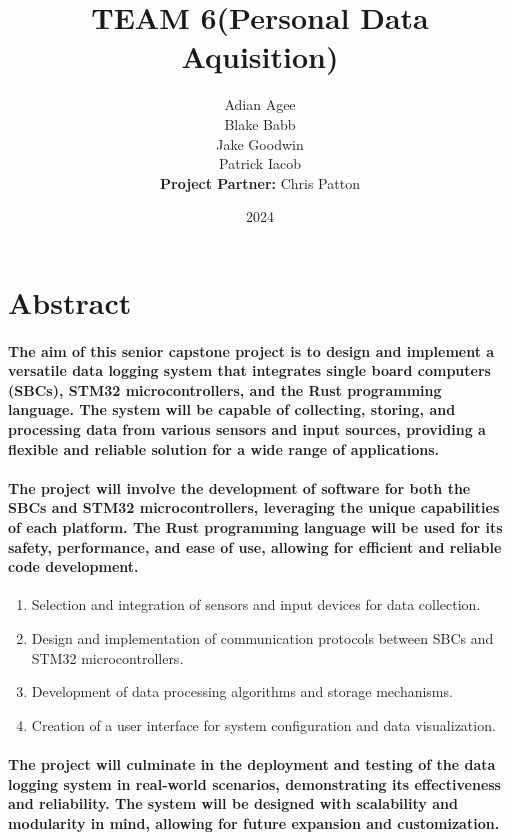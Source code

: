 \documentclass{article}
\title{TEAM 6(Personal Data Aquisition)}
\author{
Adian Agee\\
Blake Babb\\
Jake Goodwin\\
Patrick Iacob\\
\textbf{Project Partner:} Chris Patton
}
\date{2024}
\begin{document}
\maketitle
\newpage


\tableofcontents

\newpage

\section{Abstract}
\paragraph{
The aim of this senior capstone project is to design and implement a versatile
data logging system that integrates single board computers (SBCs), STM32
microcontrollers, and the Rust programming language. The system will be capable
of collecting, storing, and processing data from various sensors and input
sources, providing a flexible and reliable solution for a wide range of
applications.
}

\paragraph{
The project will involve the development of software for both the SBCs and
STM32 microcontrollers, leveraging the unique capabilities of each platform.
The Rust programming language will be used for its safety, performance, and
ease of use, allowing for efficient and reliable code development.
}

\begin{enumerate}
    \item Selection and integration of sensors and input devices for data 
        collection.
    \item Design and implementation of communication protocols between SBCs 
        and STM32 microcontrollers. 
    \item Development of data processing algorithms and storage mechanisms.
    \item Creation of a user interface for system configuration and data 
        visualization.
\end{enumerate}

\paragraph{
The project will culminate in the deployment and testing of the data logging
system in real-world scenarios, demonstrating its effectiveness and
reliability. The system will be designed with scalability and modularity in
mind, allowing for future expansion and customization.
}
\end{document}
